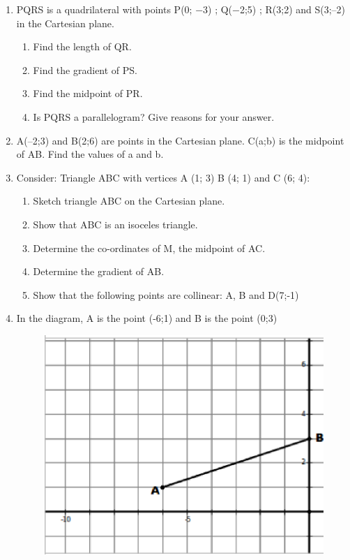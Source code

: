 \begin{enumerate}[noitemsep, label=\textbf{\arabic*}. ]
                \item  
PQRS is a quadrilateral with points P(0; −3) ; Q(−2;5) ; R(3;2) and S(3;--2)  in the Cartesian plane.
\label{m39358*id0812312}\begin{enumerate}[noitemsep, label=\textbf{\alph*}. ] 
            \label{m39358*id08123}\item Find the length of QR.\label{m39358*id981221}\item Find the gradient of PS.\label{m39358*id08213}\item Find the midpoint of PR.\label{m39358*id9871293}\item Is PQRS a parallelogram?  Give reasons for your answer. \end{enumerate}
                \item A(--2;3) and B(2;6) are points in the Cartesian plane.  C(a;b) is the midpoint of AB. Find the values of a and b.\newline
\item 
Consider: Triangle ABC with vertices A (1; 3) B (4; 1) and C (6; 4):
\label{m39358*id9173123}\begin{enumerate}[noitemsep, label=\textbf{\alph*}. ] 
            \item Sketch triangle ABC on the Cartesian plane. \item Show that ABC is an isoceles triangle.\item Determine the co-ordinates of M, the midpoint of AC.\item Determine the gradient of AB.\item Show that the following points are collinear: A, B and D(7;-1)\end{enumerate}
\item In the diagram, A is the point (-6;1) and B is the point (0;3)
    \setcounter{subfigure}{0}
	\begin{figure}[H] %
    \begin{center}
    \label{m39358*id740344!!!underscore!!!media}\label{m39358*id740344!!!underscore!!!printimage}\includegraphics[width=.7\columnwidth]{col11306.imgs/m39358_MG10C14_5.png} %

\end{center}
\end{figure}
\end{enumerate}
